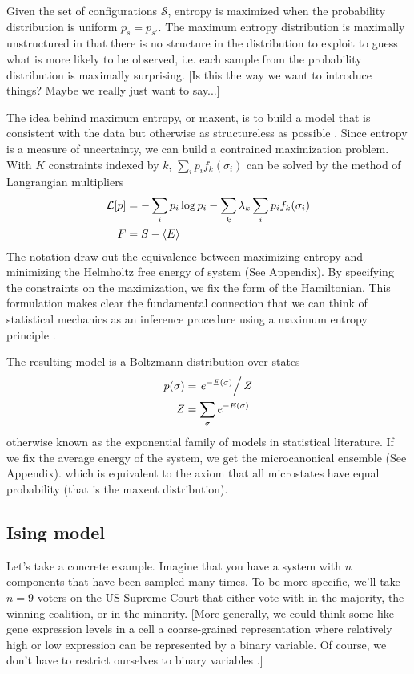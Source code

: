 \documentclass[aps,prl,twocolumn]{revtex4-1}
\begin{document}
Given the set of configurations $\mathcal{S}$, entropy is maximized when the probability distribution is uniform $p_s = p_{s'}$. The maximum entropy distribution is maximally unstructured in that there is no structure in the distribution to exploit to guess what is more likely to be observed, i.e. each sample from the probability distribution is maximally surprising. [Is this the way we want to introduce things? Maybe we really just want to say...]

The idea behind maximum entropy, or maxent, is to build a model that is consistent with the data but otherwise as structureless as possible \cite{Bretthorst:2003ua}.
Since entropy is a measure of uncertainty, we can build a contrained maximization problem. With $K$ constraints indexed by $k$, $\sum_i p_i f_k(\sigma_i)$ can be solved by the method of Langrangian multipliers
\begin{align}
	\mathcal{L}[p] &= -\sum_i p_i\log p_i - \sum_k \lambda_k \sum_i p_i f_k(\sigma_i)\\
	F &= S - \left<E\right>
\end{align}
The notation draw out the equivalence between maximizing entropy and minimizing the Helmholtz free energy of system (See Appendix). By specifying the constraints on the maximization, we fix the form of the Hamiltonian. This formulation makes clear the fundamental connection that we can think of statistical mechanics as an inference procedure using a maximum entropy principle \cite{Jaynes:1957fy}.

The resulting model is a Boltzmann distribution over states
\begin{align}
	p(\sigma) &= \left.e^{-E(\sigma)}\right/Z\\
	Z &= \sum_\sigma e^{-E(\sigma)}
\end{align}
otherwise known as the exponential family of models in statistical literature. If we fix the average energy of the system, we get the microcanonical ensemble (See Appendix). which is equivalent to the axiom that all microstates have equal probability (that is the maxent distribution).

\subsection{Ising model}
Let's take a concrete example. Imagine that you have a system with $n$ components that have been sampled many times. To be more specific, we'll take $n=9$ voters on the US Supreme Court that either vote with in the majority, the winning coalition, or in the minority. [More generally, we could think some like gene expression levels in a cell a coarse-grained representation where relatively high or low expression can be represented by a binary variable. Of course, we don't have to restrict ourselves to binary variables \cite{Lezon:2006ws}.]
\end{document}
